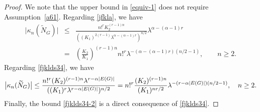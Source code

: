 \documentclass[bj,authoryear,noshowframe]{imsart}
\theoremstyle{plain}
\theoremstyle{remark}
\begin{document}
\begin{proof}
  We note that the upper bound in \eqref{equiv-1}
  does not require Assumption~\ref{a61}. 
  Regarding \eqref{jfkla}, we have  
\begin{eqnarray*} 
  \big|\kappa_n(\widetilde{N}_G)\big|
& \leq &  
  \frac{n!^r %
    K_2^{(r-1)n}}{
   (
    (K_1)^{2(r-1)}
        \lambda^{
\alpha      -(\alpha - 1)r 
        }
        )^{n/2}}
  \lambda^{
 \alpha          -(\alpha - 1)r 
  }
    \\
    & = & 
 \left(
   \frac{K_2}{K_1}
   \right)^{(r-1)n}
   n!^r
        \lambda^{-(
 \alpha      -(\alpha - 1)r 
       ) ( n/2-1)
   }, \qquad n \geq 2.
\end{eqnarray*} 
   \noindent
 Regarding \eqref{fjklds34}, we have  
$$ 
   \big|\kappa_n(\widetilde{N}_G)\big|
 \leq 
   \frac{
  n!^r
  (K_2)^{(r-1)n}
  \lambda^{r-\alpha |E(G)|}
   }{
            (
     (K_1)^r
     \lambda^{r-\alpha |E(G)|}
     )^{n/2}}
=
   n!^r
   \frac{
     (K_2)^{(r-1)n}}{(K_1)^{nr/2}}
      \lambda^{ - (r-\alpha |E(G)|)(n/2 - 1)}  , 
  \quad n \geq 2. 
$$ 
 Finally, the bound 
 \eqref{fjklds34-2} is a direct consequence of \eqref{fjklds34}. 
\end{proof}
\end{document}
